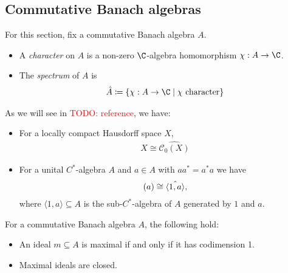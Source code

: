 \documentclass[american]{scrartcl}
\newcommand{\todo}[1]{\textcolor{red}{TODO: #1}}
\newcommand{\cC}{\mathcal{C}}
\let\sp\relax
\begin{document}
	\subsection{Commutative Banach algebras}
	For this section, fix a commutative Banach algebra $A$.
	\begin{definition}
		\leavevmode
		\begin{itemize}
			\item A \textit{character} on $A$ is a non-zero $\C$-algebra homomorphism $\chi:A\to\C$.
			\item The \textit{spectrum} of $A$ is
			\begin{align*}
				\hat{A}\coloneqq \left\{\chi:A\to \C\mid\chi\text{ character}\right\}
			\end{align*}
		\end{itemize}
	\end{definition}
	\begin{example}
		As we will see in \todo{reference}, we have:
		\begin{itemize}
			\item For a locally compact Hausdorff space $X$,
			\begin{align*}
				X\cong \hat{\cC_0(X)}
			\end{align*}
			\item For a unital $C^*$-algebra $A$ and $a\in A$ with $aa^*=a^*a$ we have
			\begin{align*}
				\sp(a)\cong \hat{\langle 1,a\rangle},
			\end{align*}
			where $\langle 1,a\rangle\subseteq A$ is the sub-$C^*$-algebra of $A$ generated by $1$ and $a$.
		\end{itemize}
	\end{example}
	\begin{fact}\label{Fact: Maximal ideals in commutative Banach algebra}
		For a commutative Banach algebra $A$, the following hold:
		\begin{itemize}
			\item An ideal $m\subseteq A$ is maximal if and only if it has codimension 1.
			\item Maximal ideals are closed.
		\end{itemize}
	\end{fact}
\end{document}
